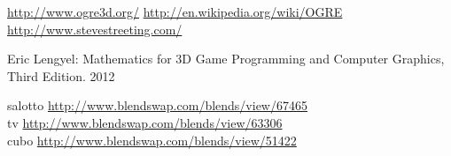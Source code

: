 \begin{thebibliography}{10}

 \url{http://www.ogre3d.org/}
 \url{http://en.wikipedia.org/wiki/OGRE}
 \url{http://www.stevestreeting.com/}







 Eric Lengyel: Mathematics for 3D Game Programming and Computer Graphics, Third Edition. 2012




 salotto \url{http://www.blendswap.com/blends/view/67465}\\
	tv  \url{http://www.blendswap.com/blends/view/63306}\\
cubo \url{http://www.blendswap.com/blends/view/51422}




\end{thebibliography}
